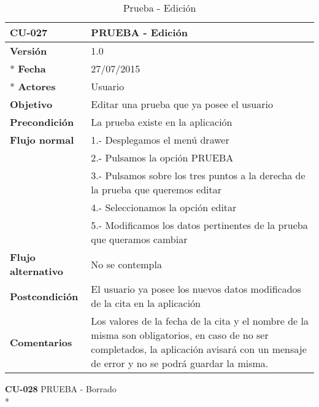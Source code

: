 \documentclass[../pfc.tex]{subfiles}
\begin{document}
	\begin{table}[H]
		\centering
		\begin{tabular}[t]{|p{3cm}|p{9.5cm}|}
			\hline \textbf{CU-027} & \textbf{PRUEBA - Edición} \\*
			\hline\hline \textbf{Versión} & 1.0 \\ *
			\hline\hline \textbf{Fecha} & 27/07/2015 \\ *
			\hline\textbf{Actores} 	& Usuario\\*
			\hline \textbf{Objetivo} & Editar una prueba que ya posee el usuario\\* 			
			\hline \textbf{Precondición} & La prueba existe en la aplicación\\* 
			\hline \textbf{Flujo normal} & 1.- Desplegamos el menú drawer \\* 
			& 2.- Pulsamos la opción PRUEBA\\*	
			& 3.- Pulsamos sobre los tres puntos a la derecha de la prueba que queremos editar\\*	
			& 4.- Seleccionamos la opción editar\\*	
			& 5.- Modificamos los datos pertinentes de la prueba que queramos cambiar\\*	
			\hline \textbf{Flujo alternativo} & No se contempla \\* 
			\hline \textbf{Postcondición} & El usuario ya posee los nuevos datos modificados de la cita en la aplicación \\* 
			\hline \textbf{Comentarios}   & Los valores de la fecha de la cita y el nombre de la misma son obligatorios, en caso de no ser completados, la aplicación avisará con un mensaje de error y no se podrá guardar la misma.\\*
			\hline
		\end{tabular}
		\caption{Prueba - Edición}
		\label{tabla:caso027}
	\end{table}
	
	\textbf{CU-028}	PRUEBA - Borrado\\*
	
\end{document}
